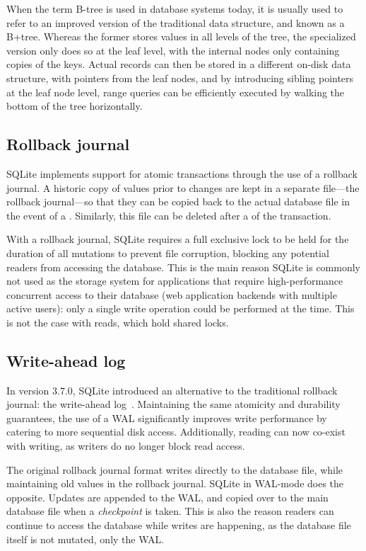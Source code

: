 When the term B-tree is used in database systems today, it is usually used to
refer to an improved version of the traditional data structure, and known as a
B+tree. Whereas the former stores values in all levels of the tree, the
specialized version only does so at the leaf level, with the internal nodes only
containing copies of the keys. Actual records can then be stored in a different
on-disk data structure, with pointers from the leaf nodes, and by introducing
sibling pointers at the leaf node level, range queries can be efficiently
executed by walking the bottom of the tree horizontally.

\subsection{Rollback journal}\label{sec:sqlite-locks}
SQLite implements support for atomic transactions through the use of a rollback
journal. A historic copy of values prior to changes are kept in a separate
file---the rollback journal---so that they can be copied back to the actual
database file in the event of a . Similarly, this file can be
deleted after a  of the transaction.

With a rollback journal, SQLite requires a full exclusive lock to be held for
the duration of all mutations to prevent file corruption, blocking any potential
readers from accessing the database. This is the main reason SQLite is commonly
not used as the storage system for applications that require high-performance
concurrent access to their database (\eg web application backends with multiple
active users): only a single write operation could be performed at the time.
This is not the case with reads, which hold shared locks.

\subsection{Write-ahead log}\label{sec:sqlite-wal}
In version 3.7.0, SQLite introduced an alternative to the traditional rollback
journal: the write-ahead log~\cite{sqlite-wal}. Maintaining the same atomicity
and durability guarantees, the use of a WAL significantly improves write
performance by catering to more sequential disk access. Additionally, reading
can now co-exist with writing, as writers do no longer block read access.

The original rollback journal format writes directly to the database file, while
maintaining old values in the rollback journal. SQLite in WAL-mode does the
opposite. Updates are appended to the WAL, and copied over to the main database
file when a \textit{checkpoint} is taken. This is also the reason readers can
continue to access the database while writes are happening, as the database file
itself is not mutated, only the WAL.\@

